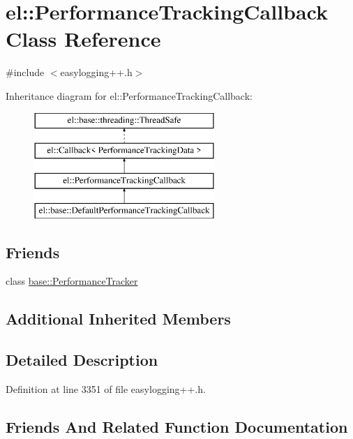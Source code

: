 \hypertarget{classel_1_1_performance_tracking_callback}{}\section{el\+:\+:Performance\+Tracking\+Callback Class Reference}
\label{classel_1_1_performance_tracking_callback}


{\ttfamily \#include $<$easylogging++.\+h$>$}

Inheritance diagram for el\+:\+:Performance\+Tracking\+Callback\+:\begin{figure}[H]
\begin{center}
\leavevmode
\includegraphics[height=4.000000cm]{classel_1_1_performance_tracking_callback}
\end{center}
\end{figure}
\subsection*{Friends}
\begin{DoxyCompactItemize}
\item 
class \hyperlink{classel_1_1_performance_tracking_callback_a05f271f9cc2531409fe682c6ce0d9feb}{base\+::\+Performance\+Tracker}
\end{DoxyCompactItemize}
\subsection*{Additional Inherited Members}


\subsection{Detailed Description}


Definition at line 3351 of file easylogging++.\+h.



\subsection{Friends And Related Function Documentation}
\hypertarget{classel_1_1_performance_tracking_callback_a05f271f9cc2531409fe682c6ce0d9feb}{}
